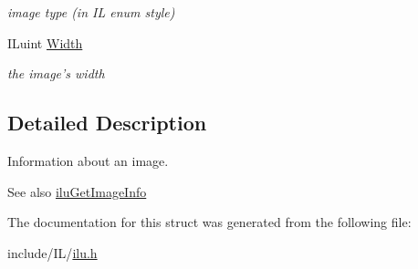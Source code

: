 \begin{DoxyCompactItemize}
\begin{DoxyCompactList}\small\item\em image type (in I\+L enum style) \end{DoxyCompactList}\item 
\hypertarget{struct_i_l_uinfo_a4146e7b2b0b4097e0e335f9b348392bf}{I\+Luint \hyperlink{struct_i_l_uinfo_a4146e7b2b0b4097e0e335f9b348392bf}{Width}}\label{struct_i_l_uinfo_a4146e7b2b0b4097e0e335f9b348392bf}

\begin{DoxyCompactList}\small\item\em the image's width \end{DoxyCompactList}\end{DoxyCompactItemize}


\subsection{Detailed Description}
Information about an image. 

\begin{DoxySeeAlso}{See also}
\hyperlink{group__ilu__util_ga2dba9fc87a5d05e1401cd5fa08cd5728}{ilu\+Get\+Image\+Info} 
\end{DoxySeeAlso}


The documentation for this struct was generated from the following file\+:\begin{DoxyCompactItemize}
\item 
include/\+I\+L/\hyperlink{ilu_8h}{ilu.\+h}\end{DoxyCompactItemize}
